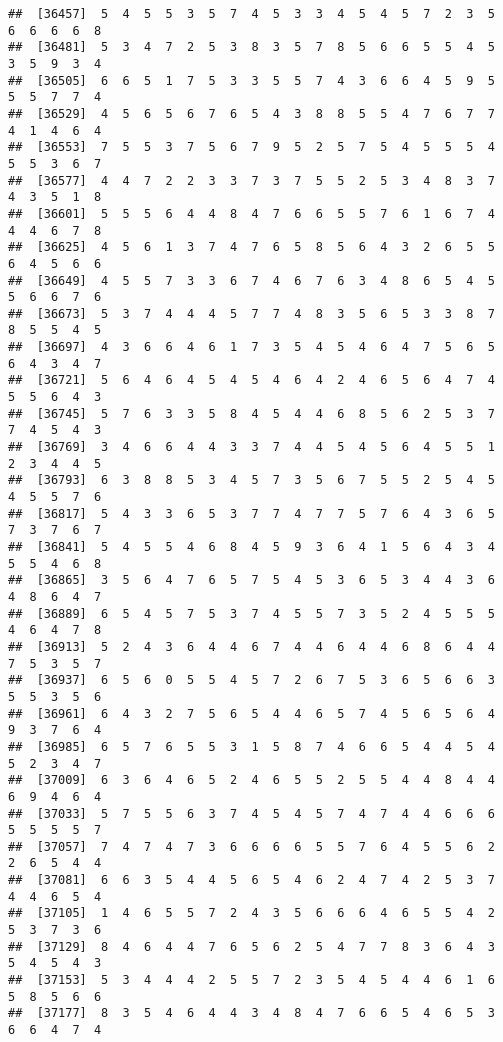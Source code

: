 \documentclass[
]{book}
\begin{document}
\begin{verbatim}
##  [36457]  5  4  5  5  3  5  7  4  5  3  3  4  5  4  5  7  2  3  5  6  6  6  6  8
##  [36481]  5  3  4  7  2  5  3  8  3  5  7  8  5  6  6  5  5  4  5  3  5  9  3  4
##  [36505]  6  6  5  1  7  5  3  3  5  5  7  4  3  6  6  4  5  9  5  5  5  7  7  4
##  [36529]  4  5  6  5  6  7  6  5  4  3  8  8  5  5  4  7  6  7  7  4  1  4  6  4
##  [36553]  7  5  5  3  7  5  6  7  9  5  2  5  7  5  4  5  5  5  4  5  5  3  6  7
##  [36577]  4  4  7  2  2  3  3  7  3  7  5  5  2  5  3  4  8  3  7  4  3  5  1  8
##  [36601]  5  5  5  6  4  4  8  4  7  6  6  5  5  7  6  1  6  7  4  4  4  6  7  8
##  [36625]  4  5  6  1  3  7  4  7  6  5  8  5  6  4  3  2  6  5  5  6  4  5  6  6
##  [36649]  4  5  5  7  3  3  6  7  4  6  7  6  3  4  8  6  5  4  5  5  6  6  7  6
##  [36673]  5  3  7  4  4  4  5  7  7  4  8  3  5  6  5  3  3  8  7  8  5  5  4  5
##  [36697]  4  3  6  6  4  6  1  7  3  5  4  5  4  6  4  7  5  6  5  6  4  3  4  7
##  [36721]  5  6  4  6  4  5  4  5  4  6  4  2  4  6  5  6  4  7  4  5  5  6  4  3
##  [36745]  5  7  6  3  3  5  8  4  5  4  4  6  8  5  6  2  5  3  7  7  4  5  4  3
##  [36769]  3  4  6  6  4  4  3  3  7  4  4  5  4  5  6  4  5  5  1  2  3  4  4  5
##  [36793]  6  3  8  8  5  3  4  5  7  3  5  6  7  5  5  2  5  4  5  4  5  5  7  6
##  [36817]  5  4  3  3  6  5  3  7  7  4  7  7  5  7  6  4  3  6  5  7  3  7  6  7
##  [36841]  5  4  5  5  4  6  8  4  5  9  3  6  4  1  5  6  4  3  4  5  5  4  6  8
##  [36865]  3  5  6  4  7  6  5  7  5  4  5  3  6  5  3  4  4  3  6  4  8  6  4  7
##  [36889]  6  5  4  5  7  5  3  7  4  5  5  7  3  5  2  4  5  5  5  4  6  4  7  8
##  [36913]  5  2  4  3  6  4  4  6  7  4  4  6  4  4  6  8  6  4  4  7  5  3  5  7
##  [36937]  6  5  6  0  5  5  4  5  7  2  6  7  5  3  6  5  6  6  3  5  5  3  5  6
##  [36961]  6  4  3  2  7  5  6  5  4  4  6  5  7  4  5  6  5  6  4  9  3  7  6  4
##  [36985]  6  5  7  6  5  5  3  1  5  8  7  4  6  6  5  4  4  5  4  5  2  3  4  7
##  [37009]  6  3  6  4  6  5  2  4  6  5  5  2  5  5  4  4  8  4  4  6  9  4  6  4
##  [37033]  5  7  5  5  6  3  7  4  5  4  5  7  4  7  4  4  6  6  6  5  5  5  5  7
##  [37057]  7  4  7  4  7  3  6  6  6  6  5  5  7  6  4  5  5  6  2  2  6  5  4  4
##  [37081]  6  6  3  5  4  4  5  6  5  4  6  2  4  7  4  2  5  3  7  4  4  6  5  4
##  [37105]  1  4  6  5  5  7  2  4  3  5  6  6  6  4  6  5  5  4  2  5  3  7  3  6
##  [37129]  8  4  6  4  4  7  6  5  6  2  5  4  7  7  8  3  6  4  3  5  4  5  4  3
##  [37153]  5  3  4  4  4  2  5  5  7  2  3  5  4  5  4  4  6  1  6  5  8  5  6  6
##  [37177]  8  3  5  4  6  4  4  3  4  8  4  7  6  6  5  4  6  5  3  6  6  4  7  4

\end{verbatim}
\end{document}
